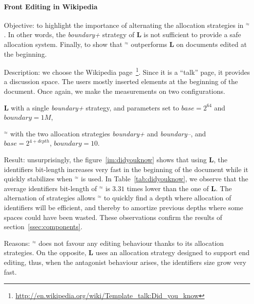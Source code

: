 \paragraph{Front Editing in Wikipedia}
\begin{asparadesc}
  
\item[Objective:] to highlight the importance of alternating the allocation
  strategies in \textbf{\NAME{}}$^\approx$. In other words, the
  \emph{boundary+} strategy of \textbf{L} is not sufficient to provide a safe
  allocation system. Finally, to show that \textbf{\NAME{}}$^\approx$
  outperforms \textbf{L} on documents edited at the beginning.

\item[Description:] we choose the Wikipedia
  page~\footnote{\url{http://en.wikipedia.org/wiki/Template_talk:Did_you_know}}. Since
  it is a ``talk'' page, it provides a discussion space. The users mostly
  inserted elements at the beginning of the document. Once again, we make the
  measurements on two configurations.
  \begin{inparaenum}[(1)]
    \item \textbf{L} with a single \emph{boundary+} strategy, and parameters
      set to $base=2^{64}$ and $boundary=1M$,
    \item \textbf{\NAME{}}$^\approx$ with the two allocation strategies
      \emph{boundary+} and \emph{boundary--}, and $base=2^{4+depth}$,
      $boundary=10$.
  \end{inparaenum}

\item[Result:] unsurprisingly, the figure~\ref{im:didyouknow} shows that using
  \textbf{L}, the identifiers bit-length increases very fast in the beginning
  of the document while it quickly stabilizes when \textbf{\NAME{}}$^\approx$
  is used. In Table~\ref{tab:didyouknow}, we observe that the average
  identifiers bit-length of \textbf{\NAME{}}$^\approx$ is $3.31$ times lower
  than the one of \textbf{L}.  The alternation of strategies allows
  \textbf{\NAME{}}$^\approx$ to quickly find a depth where allocation of
  identifiers will be efficient, and thereby to amortize previous depths where
  some spaces could have been wasted.  These observations confirm the results
  of section~\ref{ssec:components}.
  
  \item[Reasons:] \textbf{\NAME{}}$^\approx$ does not favour any editing
    behaviour thanks to its allocation strategies. On the opposite, \textbf{L}
    uses an allocation strategy designed to support end editing, thus, when
    the antagonist behaviour arises, the identifiers size grow very fast.
\end{asparadesc}

